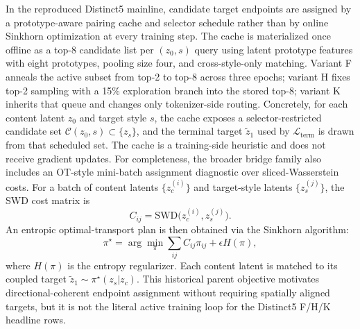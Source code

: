 \documentclass[letterpaper]{article}
\begin{document}
In the reproduced Distinct5 mainline, candidate target endpoints are assigned by a prototype-aware pairing cache and selector schedule rather than by online Sinkhorn optimization at every training step. The cache is materialized once offline as a top-8 candidate list per $(z_0,s)$ query using latent prototype features with eight prototypes, pooling size four, and cross-style-only matching. Variant F anneals the active subset from top-2 to top-8 across three epochs; variant H fixes top-2 sampling with a 15\% exploration branch into the stored top-8; variant K inherits that queue and changes only tokenizer-side routing. Concretely, for each content latent $z_0$ and target style $s$, the cache exposes a selector-restricted candidate set $\mathcal{C}(z_0,s)\subset\{z_s\}$, and the terminal target $\tilde z_1$ used by $\mathcal{L}_{\mathrm{term}}$ is drawn from that scheduled set. The cache is a training-side heuristic and does not receive gradient updates. For completeness, the broader bridge family also includes an OT-style mini-batch assignment diagnostic over sliced-Wasserstein costs. For a batch of content latents $\{z_c^{(i)}\}$ and target-style latents $\{z_s^{(j)}\}$, the SWD cost matrix is
\begin{equation}
    C_{ij} = \mathrm{SWD}\bigl(z_c^{(i)}, z_s^{(j)}\bigr) .
\end{equation}
An entropic optimal-transport plan is then obtained via the Sinkhorn algorithm:
\begin{equation}
    \pi^\star = \arg\min_\pi \sum_{ij} C_{ij}\pi_{ij} + \epsilon H(\pi),
\end{equation}
where $H(\pi)$ is the entropy regularizer. Each content latent is matched to its coupled target $\tilde{z}_1 \sim \pi^\star(z_s|z_c)$. This historical parent objective motivates directional-coherent endpoint assignment without requiring spatially aligned targets, but it is not the literal active training loop for the Distinct5 F/H/K headline rows.
\end{document}
